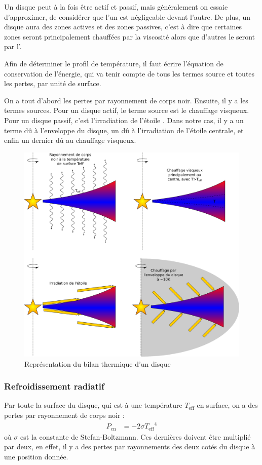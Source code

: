 Un disque peut à la fois être actif et passif, mais généralement on essaie d'approximer, de considérer que l'un est négligeable devant l'autre. De plus, un disque aura des zones actives et des zones passives, c'est à dire que certaines zones seront principalement chauffées par la viscosité alors que d'autres le seront par l'.

\bigskip

Afin de déterminer le profil de température, il faut écrire l'équation de conservation de l'énergie, qui va tenir compte de tous les termes source et toutes les pertes, par unité de surface.

On a tout d'abord les pertes par rayonnement de corps noir. Ensuite, il y a les termes sources. Pour un disque actif, le terme source est le chauffage visqueux. Pour un disque passif, c'est l'irradiation de l'étoile \citep{chiang1997spectral}. Dans notre cas, il y a un terme dû à l'enveloppe du disque, un dû à l'irradiation de l'étoile centrale, et enfin un dernier dû au chauffage visqueux.


\begin{figure}[htbp]
\centering
\includegraphics[width=0.65\linewidth]{figure/disk_energy.pdf}
\caption{Représentation du bilan thermique d'un disque}\label{fig:energy_equilibrium}
\end{figure}

\subsubsection{Refroidissement radiatif}
Par toute la surface du disque, qui est à une température $T_\text{eff}$ en surface, on a des pertes par rayonnement de corps noir : 
\begin{align}
P_\text{cn} &= - 2\sigma {T_\text{eff}}^4
\end{align}
où $\sigma$ est la constante de Stefan-Boltzmann. Ces dernières doivent être multiplié par deux, en effet, il y a des pertes par rayonnements des deux cotés du disque à une position donnée. 

